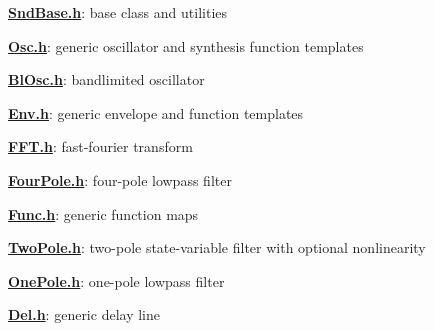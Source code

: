 {\bfseries \hyperlink{_snd_base_8h}{Snd\+Base.\+h}}\+: base class and utilities

{\bfseries \hyperlink{_osc_8h}{Osc.\+h}}\+: generic oscillator and synthesis function templates

{\bfseries \hyperlink{_bl_osc_8h}{Bl\+Osc.\+h}}\+: bandlimited oscillator

{\bfseries \hyperlink{_env_8h}{Env.\+h}}\+: generic envelope and function templates

{\bfseries \hyperlink{_f_f_t_8h}{F\+F\+T.\+h}}\+: fast-\/fourier transform

{\bfseries \hyperlink{_four_pole_8h}{Four\+Pole.\+h}}\+: four-\/pole lowpass filter

{\bfseries \hyperlink{_func_8h}{Func.\+h}}\+: generic function maps

{\bfseries \hyperlink{_two_pole_8h}{Two\+Pole.\+h}}\+: two-\/pole state-\/variable filter with optional nonlinearity

{\bfseries \hyperlink{_one_pole_8h}{One\+Pole.\+h}}\+: one-\/pole lowpass filter

{\bfseries \hyperlink{_del_8h}{Del.\+h}}\+: generic delay line 